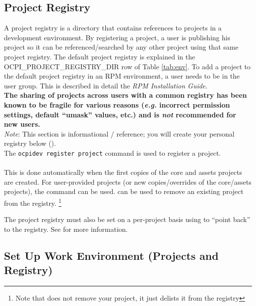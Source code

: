 \subsection{Project Registry}
A project registry is a directory that contains references to projects in a development environment. By registering a project, a user is publishing his project so it can be referenced/searched by any other project using that same project registry. The default project registry is explained in the OCPI\_PROJECT\_REGISTRY\_DIR row of Table \ref{tab:env}. To add a project to the default project registry in an RPM environment, a user needs to be in the  user group. This is described in detail the \textit{RPM Installation Guide}. \\

\textbf{The sharing of projects across users with a common registry has been known to be fragile for various reasons (\textit{e.g.} incorrect permission settings, default ``umask'' values, etc.) and is \textit{not} recommended for new users.} \\

\textit{Note}: This section is informational / reference; you will create your personal registry below (). \\

The \verb+ocpidev register project+ command is used to register a project.\\
 \\
This is done automatically when the first copies of the core and assets projects are created.
For user-provided projects (or new copies/overrides of the core/assets projects), the  command can be used.
 can be used to remove an existing project from the registry.%
\footnote{Note that  does not remove your project, it just delists it from the registry}\\


The project registry must also be set on a per-project basis using  to ``point back'' to the registry. See  for more information.

\subsection{Set Up Work Environment (Projects and Registry)}
